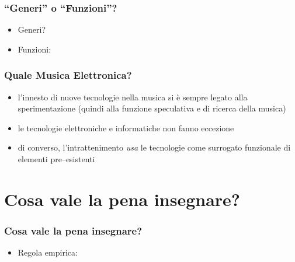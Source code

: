 \documentclass[compress,\mode]{beamer}
\begin{document}
\begin{frame}

  \frametitle<+->{``Generi'' o ``Funzioni''?}

  \begin{itemize}[<+- | alert@+>]

     \item Generi?

     \item Funzioni: 

  \end{itemize}

\end{frame}

\begin{frame}

  \frametitle<+->{Quale Musica Elettronica?}

  \begin{itemize}[<+- | alert@+>]

    \item l'innesto di nuove tecnologie nella musica si \`e
            sempre legato alla sperimentazione (quindi alla funzione
            speculativa e di ricerca della musica)

    \item le tecnologie elettroniche e informatiche non fanno eccezione

    \item di converso, l'intrattenimento \emph{usa} le tecnologie come
            surrogato funzionale di elementi pre--esistenti

  \end{itemize}

\end{frame}

\section{Cosa vale la pena insegnare?}

\begin{frame}

  \frametitle<+->{Cosa vale la pena insegnare?}

  \begin{itemize}[<+- | alert@+>]

     \item Regola empirica: 
            
  \end{itemize}

\end{frame}
\end{document}
